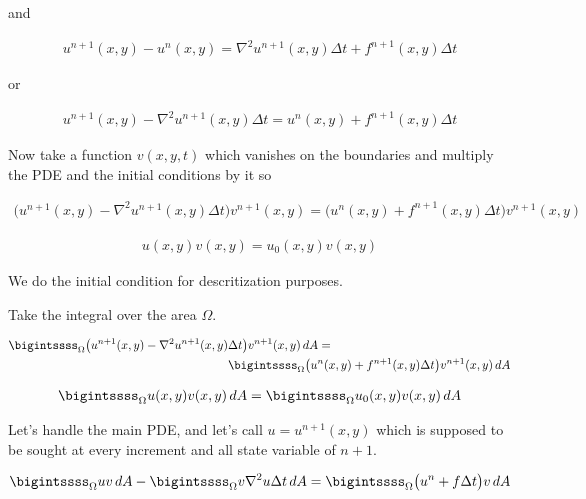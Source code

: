 \documentclass{article}
\begin{document}
	and
	
	
	\begin{gather}
		u^{n+1}(x,y)-u^n(x,y) = \nabla^2u^{n+1}(x,y)\Delta t + f^{n+1}(x,y) \Delta t
	\end{gather}
	
	or
	
	\begin{gather}
	u^{n+1}(x,y) - \nabla^2u^{n+1}(x,y)\Delta t  = u^n(x,y) + f^{n+1}(x,y) \Delta t
	\end{gather}
	
	Now take a function $v(x,y,t)$ which vanishes on the boundaries and multiply the PDE and the initial conditions by it so
	
	\begin{gather}
	\big( u^{n+1}(x,y) - \nabla^2u^{n+1}(x,y)\Delta t \big)v^{n+1}(x,y)  = \big(u^n(x,y) + f^{n+1}(x,y) \Delta t\big)v^{n+1}(x,y)
	\end{gather}
	
	\begin{gather}
		u(x,y)v(x,y) = u_0(x,y)v(x,y)
	\end{gather}
	
	We do the initial condition for descritization purposes.
	
	Take the integral over the area $\Omega$.
	
	\begin{gather}
	\begin{split}
		 \bigintssss_{\Omega} \big( u^{n+1}(x,y) - \nabla^2u^{n+1}(x,y)&\Delta t \big)v^{n+1}(x,y)\,dA  =\\
		& \bigintssss_{\Omega} \big(u^n(x,y) + f^{n+1}(x,y) \Delta t\big)v^{n+1}(x,y)\,dA
	\end{split}
	\end{gather}
	
	\begin{gather}
	\begin{split}
		\bigintssss_{\Omega} u(x,y)v(x,y)\,dA = \bigintssss_{\Omega} u_0(x,y)v(x,y)\,dA
	\end{split}
	\end{gather}
	
	Let's handle the main PDE, and let's call $u=u^{n+1}(x,y)$ which is supposed to be sought at every increment and all state variable of $n+1$.
	
	\begin{gather}
	\begin{split}
	\bigintssss_{\Omega} uv\,dA  - \bigintssss_{\Omega} v\nabla^2u\Delta t \,dA =  \bigintssss_{\Omega} \big(u^n + f \Delta t\big)v\,dA
	\end{split}
	\end{gather}
	
\end{document}
